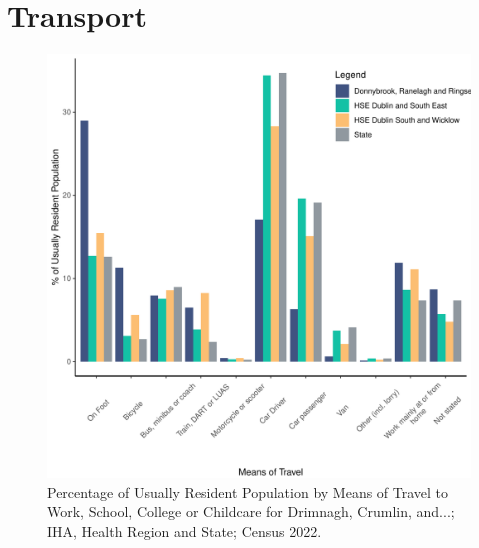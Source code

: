 \documentclass{article}
\begin{document}
\section{Transport}\label{sect:Trans}
\begin{figure}[H]
	\centering
	\includegraphics[width = 120mm]{../figures/TravelED.pdf}
	\caption{Percentage of Usually Resident Population by Means of Travel to Work, School, College or Childcare for Drimnagh, Crumlin, and...; IHA, Health Region and State; Census 2022.}
	\label{fig:vbnv}
	\end{figure}
\end{document}
